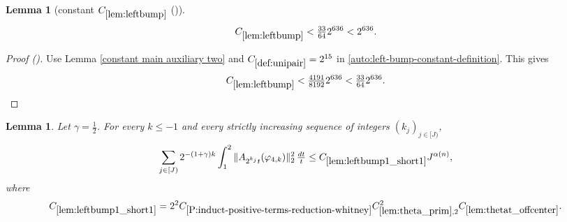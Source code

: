 \documentclass[12pt,reqno]{amsart}
\newcommand{\auto}{{({\tiny\faCar})}}
\theoremstyle{plain}
\newtheorem{lemma}[theorem]{Lemma}
\numberwithin{equation}{section}
\theoremstyle{remark}
\newcommand{\uses}[1]{}
\newcommand{\usesdefs}[1]{}
\begin{document}
\begin{lemma}[constant $C_{\ref{lem:leftbump}}$ \auto]\label{constant left bump}\uses{constant main auxiliary two,lem:leftbump}\usesdefs{def:unipair}
\begin{equation}\label{constant left bump bound}
C_{\ref{lem:leftbump}}<\tfrac{33}{64}2^{636}<2^{636}.
\end{equation}
\end{lemma}
\begin{proof}[Proof \auto]
Use Lemma \ref{constant main auxiliary two} and $C_{\ref{def:unipair}}=2^{15}$ in \eqref{auto:left-bump-constant-definition}. This gives
\[
C_{\ref{lem:leftbump}}
<\tfrac{4191}{8192}2^{636}
<\tfrac{33}{64}2^{636}.
\]
\end{proof}

\begin{lemma}\label{lem:leftbump1_short1}\uses{Extension of sequences,A to Lambda,lem:theta_prim,lem:thetat_offcenter,P:induct-positive-terms-reduction-whitney,lem:int_fct,lem:phi4_supp}\usesdefs{A_def,bracket bump,normalized function tuples,auto:prism-form-definition,multiplicatively spaced monotone sequences,defn:window based bump functions}
Let $\gamma=\frac12$. For every $k\le-1$ and every strictly increasing sequence of integers $(k_j)_{j\in[J)}$,
\begin{equation}\label{auto:left-bump-one-short-one-bound}
\sum_{j\in[J)}2^{-(1+\gamma)k}\int_1^2
\|A_{2^{k_j}t}(\varphi_{4,k})\|_2^2\,\tfrac{dt}{t}
\le C_{\ref{lem:leftbump1_short1}}J^{\alpha(n)},
\end{equation}
where
\begin{equation}\label{auto:left-bump-one-short-one-constant-definition}
C_{\ref{lem:leftbump1_short1}}
=2^2C_{\ref{P:induct-positive-terms-reduction-whitney}}
C_{\ref{lem:theta_prim},2}^2C_{\ref{lem:thetat_offcenter}}.
\end{equation}
\end{lemma}
\end{document}
